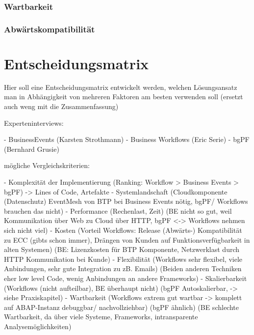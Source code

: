\subsubsection{Wartbarkeit}


\subsubsection{Abwärtskompatibilität}



\section{Entscheidungsmatrix}

Hier soll eine Entscheidungsmatrix entwickelt werden, welchen Lösungsansatz man in Abhängigkeit von mehreren Faktoren am besten verwenden soll (ersetzt auch weng mit die Zusammenfassung)
\newline

Experteninterviews:

- BusinessEvents (Karsten Strothmann) \newline
- Business Workflows (Eric Serie) \newline
- bgPF (Bernhard Grusie)

mögliche Vergleichskriterien:

- Komplexität der Implementierung (Ranking: Workflow > Business Events > bgPF) -> Lines of Code, Artefakte \newline
- Systemlandschaft (Cloudkomponente (Datenschutz) EventMesh von BTP bei Business Events nötig, bgPF/ Workflows brauchen das nicht) \newline
- Performance (Rechenlast, Zeit) (BE nicht so gut, weil Kommunikation über Web zu Cloud über HTTP, bgPF <-> Workflows nehmen sich nicht viel) \newline
- Kosten (Vorteil Workflows: Release (Abwärts-) Kompatibilität zu ECC (gibts schon immer), Drängen von Kunden auf Funktionsverfügbarkeit in alten Systemen) (BE: Lizenzkosten für BTP Komponente, Netzwerklast durch HTTP Kommunikation bei Kunde) \newline
- Flexibilität (Workflows sehr flexibel, viele Anbindungen, sehr gute Integration zu zB. Emails) (Beiden anderen Techniken eher low level Code, wenig Anbindungen an andere Frameworks) \newline
- Skalierbarkeit (Workflows (nicht aufteilbar), BE überhaupt nicht) (bgPF Autoskalierbar, -> siehe Praxiskapitel) \newline
- Wartbarkeit (Workflows extrem gut wartbar -> komplett auf ABAP-Instanz debuggbar/ nachvollziehbar) (bgPF ähnlich) (BE schlechte Wartbarkeit, da über viele Systeme, Frameworks, intransparente Analysemöglichkeiten)